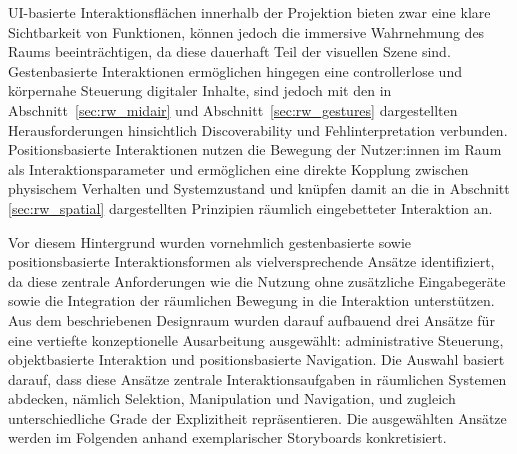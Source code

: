 UI-basierte Interaktionsflächen innerhalb der Projektion bieten zwar eine klare Sichtbarkeit von Funktionen, können jedoch die immersive Wahrnehmung des Raums beeinträchtigen, da diese dauerhaft Teil der visuellen Szene sind. Gestenbasierte Interaktionen ermög\-lichen hingegen eine controllerlose und körpernahe Steuerung digitaler Inhalte, sind jedoch mit den in Abschnitt~\ref{sec:rw_midair} und Abschnitt~\ref{sec:rw_gestures} dargestellten Herausforderungen hinsichtlich Discoverability und Fehlinterpretation verbunden.
Positionsbasierte Interaktionen nutzen die Bewegung der Nutzer:innen im Raum als Interaktionsparameter und ermög\-lichen eine direkte Kopplung zwischen physischem Verhalten und Systemzustand und knüpfen damit an die in Abschnitt \ref{sec:rw_spatial} dargestellten Prinzipien räumlich eingebetteter Interaktion an.

Vor diesem Hintergrund wurden vornehmlich gestenbasierte sowie positionsbasierte Interaktionsformen als vielversprechende Ansätze identifiziert, da diese zentrale Anforderungen wie die Nutzung ohne zusätzliche Eingabegeräte sowie die Integration der räumlichen Bewegung in die Interaktion unterstützen.
Aus dem beschriebenen Designraum wurden darauf aufbauend drei Ansätze für eine vertiefte konzeptionelle Ausarbeitung ausgewählt: administrative Steuerung, objektbasierte Interaktion und positionsbasierte Navigation.
Die Auswahl basiert darauf, dass diese Ansätze zentrale Interaktionsaufgaben in räumlichen Systemen abdecken, nämlich Selektion, Manipulation und Navigation, und zugleich unterschiedliche Grade der Explizitheit repräsentieren. Die ausgewählten Ansätze werden im Folgenden anhand exemplarischer Storyboards konkretisiert.

